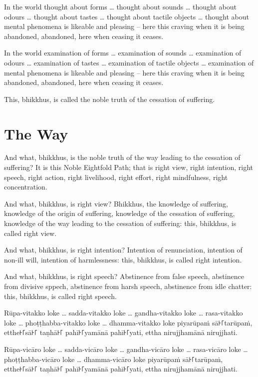 \englishPage

In the world thought about forms \ldots{} thought about sounds \ldots{} thought
about odours \ldots{} thought about tastes \ldots{} thought about tactile
objects \ldots{} thought about mental phenomena is likeable and pleasing -- here
this craving when it is being abandoned, abandoned, here when ceasing it ceases.

In the world examination of forms \ldots{} examination of sounds \ldots{}
examination of odours \ldots{} examination of tastes \ldots{} examination of
tactile objects \ldots{} examination of mental phenomena is likeable and
pleasing -- here this craving when it is being abandoned, abandoned, here when
ceasing it ceases.

This, bhikkhus, is called the noble truth of the cessation of suffering.

\section{The Way}

And what, bhikkhus, is the noble truth of the way leading to the cessation of
suffering? It is this Noble Eightfold Path; that is right view, right intention,
right speech, right action, right livelihood, right effort, right mindfulness,
right concentration.

And what, bhikkhus, is right view? Bhikkhus, the knowledge of suffering,
knowledge of the origin of suffering, knowledge of the cessation of suffering,
knowledge of the way leading to the cessation of suffering: this, bhikkhus, is
called right view.

And what, bhikkhus, is right intention? Intention of renunciation, intention of
non-ill will, intention of harmlessness: this, bhikkhus, is called right
intention.

And what, bhikkhus, is right speech? Abstinence from false speech, abstinence
from divisive sppech, abstinence from harsh speech, abstinence from idle
chatter: this, bhikkhus, is called right speech.

\paliPage

Rūpa-vitakko loke \ldots{} sadda-vitakko loke \ldots{} gandha-vitakko loke \ldots{}
rasa-vitakko loke \ldots{} phoṭṭhabba-vitakko loke \ldots{} dhamma-vitakko loke
piyarūpaṁ sā꜔꜒tarūpaṁ, etthe꜔꜒sā꜔꜒ taṇhā꜔꜒ pahī꜔꜒yamānā pahī꜔꜒yati, ettha nirujjhamānā
nirujjhati.

Rūpa-vicāro loke \ldots{} sadda-vicāro loke \ldots{} gandha-vicāro loke \ldots{}
rasa-vicāro loke \ldots{} phoṭṭhabba-vicāro loke \ldots{} dhamma-vicāro loke
piyarūpaṁ sā꜔꜒tarūpaṁ, etthe꜔꜒sā꜔꜒ taṇhā꜔꜒ pahī꜔꜒yamānā pahī꜔꜒yati, ettha nirujjhamānā
nirujjhati.

